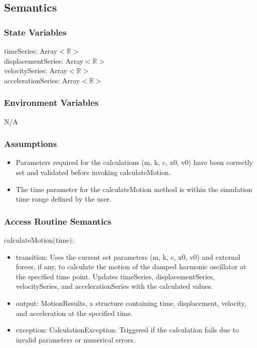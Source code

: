 \documentclass[12pt, titlepage]{article}
\begin{document}
\subsection{Semantics}

\subsubsection{State Variables}
timeSeries: Array$<\mathbb{R}>$\\ %
displacementSeries: Array$<\mathbb{R}>$\\ %
velocitySeries: Array$<\mathbb{R}>$\\ %
accelerationSeries: Array$<\mathbb{R}>$ %

\subsubsection{Environment Variables}

N/A

\subsubsection{Assumptions}

\begin{itemize}
  \item Parameters required for the calculations (m, k, c, x0, v0) have been correctly set and validated before invoking calculateMotion.
  \item The time parameter for the calculateMotion method is within the simulation time range defined by the user.
\end{itemize}

\subsubsection{Access Routine Semantics}

\noindent calculateMotion(time):
\begin{itemize}
\item transition: Uses the current set parameters (m, k, c, x0, v0) and external forces, if any, to calculate the motion of the damped harmonic oscillator at the specified time point. Updates timeSeries, displacementSeries, velocitySeries, and accelerationSeries with the calculated values.
\item output: MotionResults, a structure containing time, displacement, velocity, and acceleration at the specified time.
\item exception: CalculationException: Triggered if the calculation fails due to invalid parameters or numerical errors.
\end{itemize}
\end{document}
